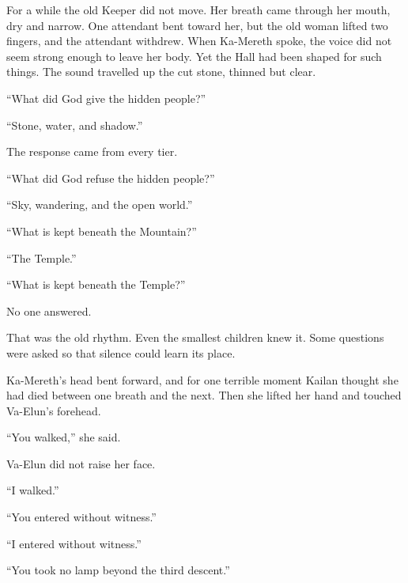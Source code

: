 For a while the old Keeper did not move. Her breath came through her mouth, dry and narrow. One attendant bent toward her, but the old woman lifted two fingers, and the attendant withdrew. When Ka-Mereth spoke, the voice did not seem strong enough to leave her body. Yet the Hall had been shaped for such things. The sound travelled up the cut stone, thinned but clear.\par

“What did God give the hidden people?”\par

“Stone, water, and shadow.”\par

The response came from every tier.\par

“What did God refuse the hidden people?”\par

“Sky, wandering, and the open world.”\par

“What is kept beneath the Mountain?”\par

“The Temple.”\par

“What is kept beneath the Temple?”\par

No one answered.\par

That was the old rhythm. Even the smallest children knew it. Some questions were asked so that silence could learn its place.\par

Ka-Mereth’s head bent forward, and for one terrible moment Kailan thought she had died between one breath and the next. Then she lifted her hand and touched Va-Elun’s forehead.\par

“You walked,” she said.\par

Va-Elun did not raise her face.\par

“I walked.”\par

“You entered without witness.”\par

“I entered without witness.”\par

“You took no lamp beyond the third descent.”\par

